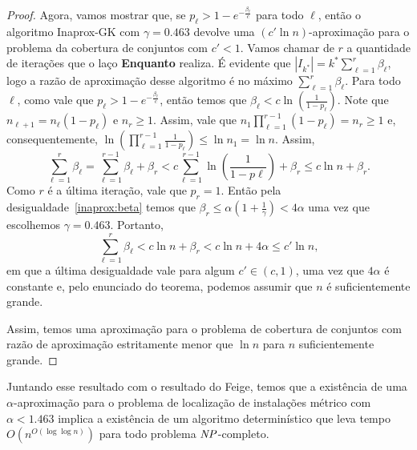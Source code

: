 \begin{proof}
Agora, vamos mostrar que, se $p_\ell > 1 - e^{ - \frac{\beta_\ell}{c}}$ para todo $\ell$, então o algoritmo {\sc Inaprox-GK} com $\gamma = 0.463$ devolve uma $(c'\ln n)$-aproximação para o problema da cobertura de conjuntos com $c' < 1$. Vamos chamar de $r$ a quantidade de iterações que o laço {\bf Enquanto} realiza. É evidente que $|I_{k^*}| = k^*\sum_{\ell = 1}^r \beta_\ell$, logo a razão de aproximação desse algoritmo é no máximo $\sum_{\ell = 1}^r \beta_\ell$. Para todo $\ell$, como vale que $p_\ell > 1 - e^{ - \frac{\beta_\ell}{c}}$, então temos que $\beta_\ell < c \ln\left( \frac{1}{1-p_\ell}\right)$. Note que $n_{\ell + 1} = n_\ell(1-p_\ell)$ e $n_r \geq 1$. Assim, vale que $n_1 \prod_{\ell =1}^{r-1} (1 - p_\ell) = n_r \geq 1$ e, consequentemente, $\ln\left(\prod_{\ell =1 }^{r-1} \frac{1}{1-p_\ell}\right) \leq \ln n_1 = \ln n$. Assim,
\[ \sum_{\ell= 1}^r \beta_\ell = \sum_{\ell =1}^{r-1} \beta_\ell + \beta_r < c\sum_{\ell = 1}^{r-1} \ln \left( \frac{1}{1-p\ell}\right) + \beta_r \leq c \ln n + \beta_r. \]
Como $r$ é a última iteração, vale que $p_r= 1$. Então pela desigualdade~\eqref{inaprox:beta} temos que $\beta_r \leq \alpha(1 + \frac{1}{\gamma}) < 4\alpha$ uma vez que escolhemos $\gamma = 0.463$. Portanto,
\[
\sum_{\ell =1}^r \beta_\ell < c \ln n + \beta_r < c\ln n + 4\alpha \leq c' \ln n,
\]
em que a última desigualdade vale para algum $c' \in (c,1)$, uma vez que $4\alpha$ é constante e, pelo enunciado do teorema, podemos assumir que $n$ é suficientemente grande.

Assim, temos uma aproximação para o problema de cobertura de conjuntos com razão de aproximação estritamente menor que $\ln n$ para $n$ suficientemente grande.
\end{proof}

Juntando esse resultado com o resultado do Feige, temos que a existência de uma $\alpha$-aproximação para o problema de localização de instalações métrico com $\alpha < 1.463$ implica a existência de um algoritmo determinístico que leva tempo $O(n^{O(\log \log n)})$ para todo problema $\mathit{NP}$-completo.